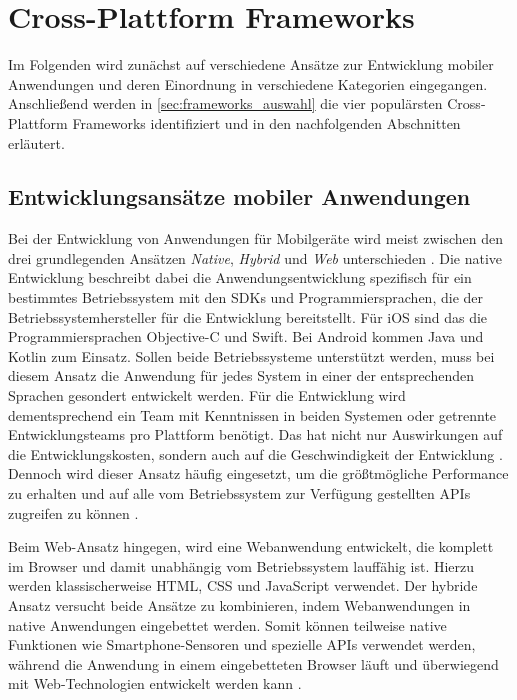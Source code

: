 \chapter{Cross-Plattform Frameworks}
\label{ch:frameworks}

Im Folgenden wird zunächst auf verschiedene Ansätze zur Entwicklung mobiler Anwendungen und deren Einordnung in verschiedene Kategorien eingegangen.
Anschließend werden in \autoref{sec:frameworks_auswahl} die vier populärsten Cross-Plattform Frameworks identifiziert und in den nachfolgenden Abschnitten erläutert.

\section{Entwicklungsansätze mobiler Anwendungen}
\label{sec:entwicklungsansaetze}
Bei der Entwicklung von Anwendungen für Mobilgeräte wird meist zwischen den drei grundlegenden Ansätzen \textit{Native}, \textit{Hybrid} und \textit{Web} unterschieden \cite{Nunkesser_Taxonomy_Apps, Que_Comparison_Hybrid_Native}.
Die native Entwicklung beschreibt dabei die Anwendungsentwicklung spezifisch für ein bestimmtes Betriebssystem mit den \acp{SDK} und Programmiersprachen, die der Betriebssystemhersteller für die Entwicklung bereitstellt.
Für iOS sind das die Programmiersprachen Objective-C und Swift.
Bei Android kommen Java und Kotlin zum Einsatz.
Sollen beide Betriebssysteme unterstützt werden, muss bei diesem Ansatz die Anwendung für jedes System in einer der entsprechenden Sprachen gesondert entwickelt werden.
Für die Entwicklung wird dementsprechend ein Team mit Kenntnissen in beiden Systemen oder getrennte Entwicklungsteams pro Plattform benötigt.
Das hat nicht nur Auswirkungen auf die Entwicklungskosten, sondern auch auf die Geschwindigkeit der Entwicklung \cite{Manchanda_CrossPlatformFrameworks}.
Dennoch wird dieser Ansatz häufig eingesetzt, um die größtmögliche Performance zu erhalten und auf alle vom Betriebssystem zur Verfügung gestellten \acp{API} zugreifen zu können \cite{Pinto_Native_to_Cross_Platform}.

Beim Web-Ansatz hingegen, wird eine Webanwendung entwickelt, die komplett im Browser und damit unabhängig vom Betriebssystem lauffähig ist.
Hierzu werden klassischerweise \ac{HTML}, \ac{CSS} und JavaScript verwendet.
Der hybride Ansatz versucht beide Ansätze zu kombinieren, indem Webanwendungen in native Anwendungen eingebettet werden.
Somit können teilweise native Funktionen wie Smartphone-Sensoren und spezielle \acp{API} verwendet werden, während die Anwendung in einem eingebetteten Browser läuft und überwiegend mit Web-Technologien entwickelt werden kann \cite{Nunkesser_Taxonomy_Apps}.

